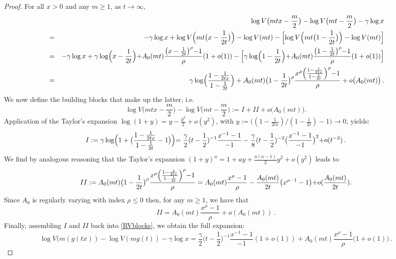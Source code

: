 \documentclass[10pt,a4paper]{amsart}
\begin{document}
\begin{proof}
        For all $x>0$ and any $m \geq 1$, as $t \rightarrow \infty$,
    \begin{eqnarray*}
 & &\log V \bigl(mtx -\frac{m}{2} \bigr) - \log V\bigl(mt -\frac{m}{2} \bigr) - \gamma\log x\\
 &=& -\gamma\log x +\log V \Bigl( mt \bigl(x -\frac{1}{2t} \bigr) \Bigr) -\log V(mt) - \Bigl[\log  V \Bigl( mt \bigl(1 -\frac{1}{2t} \bigr) \Bigr) -\log V(mt)\Bigr]\\
 &=& -\gamma\log x + \gamma\log \Bigl(x-\frac{1}{2t}\Bigl)+A_{0}(mt)\frac{\bigl(x-\frac{1}{2t}\bigl)^{\rho}-1}{\rho}(1+o(1))-\Bigl[\gamma\log\Bigl(1-\frac{1}{2t}\Bigl)+A_{0}(mt)\frac{\bigl(1-\frac{1}{2t}\bigl)^{\rho}-1}{\rho}(1+o(1))\Bigr]\\
 &=&\gamma\log \Bigl(\frac{1-\frac{1}{2tx}}{1-\frac{1}{2t}} \Bigr)+A_{0}(mt)\bigl(1-\frac{1}{2t}\bigr)^{\rho} \frac{x^{\rho} \Bigl(\frac{1-\frac{1}{2tx}}{1-\frac{1}{2t}}\Bigl)^{\rho}-1}{\rho} + o \bigl( A_0(mt)\bigr)\,.
\end{eqnarray*}
We now define the building blocks that make up the latter, i.e.
\begin{equation}\label{RVblocks}
    \log V \bigl(mtx -\frac{m}{2} \bigr) - \log V\bigl(mt -\frac{m}{2} \bigr):= I+II + o \bigl( A_0(mt)\bigr).
\end{equation}
Application of the Taylor's expansion $\log(1+y)=y-\frac{y^2}{2}+o(y^2)$, with $y:=\bigl((1-\frac{1}{2tx})/(1-\frac{1}{2t})-1\bigl) \rightarrow 0$, yields:
\begin{equation*}
	I:= \gamma\log\Bigl(1+\bigl(\frac{1-\frac{1}{2tx}}{1-\frac{1}{2t}}-1\bigl)\Bigl) = \frac{\gamma}{2}(t-\frac{1}{2})^{-1}\frac{x^{-1}-1}{-1}-\frac{\gamma}{8}(t-\frac{1}{2})^{-2}\bigl(\frac{x^{-1}-1}{-1}\bigl)^2 + o(t^{-2})\,.
\end{equation*}
We find by analogous reasoning that the Taylor's expansion $(1+y)^a=1+ay+\frac{a(a-1)}{2}y^2+o(y^2)$ leads to
\begin{equation*}
 II:= A_0(mt)\bigl(1-\frac{1}{2t}\bigr)^{\rho} \frac{x^{\rho} \Bigl(\frac{1-\frac{1}{2tx}}{1-\frac{1}{2t}}\Bigl)^{\rho}-1}{\rho} =A_{0}(mt)\frac{x^{\rho}-1}{\rho}-\frac{A_{0}(mt)}{2t}\bigl(x^{\rho-1}-1\bigl)+o(\frac{A_{0}(mt)}{2t}).
\end{equation*}
Since $A_0$ is regularly varying with index $\rho\leq 0$ then, for any $m\geq1$, we have that
\begin{equation*}
    II=A_{0}(mt)\frac{x^{\rho}-1}{\rho}+o(A_{0}(mt))\,.
\end{equation*}
Finally, assembling $I$ and $II$ back into \eqref{RVblocks}, we obtain the full expansion:
\begin{equation*}
    \log V(m(g(tx))-\log V(mg(t))-\gamma \log x=\frac{\gamma}{2}\bigl(t-\frac{1}{2}\bigl)^{-1}\frac{x^{-1}-1}{-1}(1+o(1))+A_{0}(mt)\frac{x^{\rho}-1}{\rho}\bigl(1+o(1)\bigl)\,.  
\end{equation*}
\end{proof}	
\end{document}
